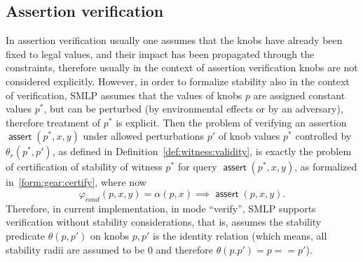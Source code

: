 \documentclass[a4paper,parskip=half]{article} %
\newcommand*\eqdef=
\newcommand*\assert{\operatorname{\mathsf{assert}}}
\begin{document}
\subsection{Assertion verification}


In assertion verification usually one assumes that the knobs have already been fixed to legal values, and their impact has been propagated 
through the constraints, therefore usually in the context of assertion verification knobs are not considered explicitly. However, in order 
to formalize stability also in the context of verification, SMLP assumes that the values of knobs $p$ are assigned constant values $p^*$, 
but can be perturbed (by environmental effects or by an adversary), therefore treatment of $p^*$ is explicit. Then the problem of 
verifying an assertion $\assert(p^*,x,y)$ under allowed perturbations $p'$ of knob values $p^*$ controlled by $\theta_r(p^*, p')$, 
as defined in Definition~\ref{def:witness:validity}, is exactly the problem of certification of stability 
of witness $p^*$ for query $\assert(p^*,x,y)$, as formalized in~\cref{form:gear:certify}, 
where now  \[\varphi_{\mathit{cond}}(p,x,y) \eqdef \alpha(p,x) \implies \assert(p,x,y).\] Therefore, in current implementation, 
in mode ``verify'', SMLP supports verification without stability considerations, that is, assumes the stability predicate $\theta(p,p')$ on 
knobs $p,p'$ is the identity relation (which means, all stability radii are assumed to be $0$ and therefore $\theta(p.p') \eqdef p == p'$).
\end{document}
